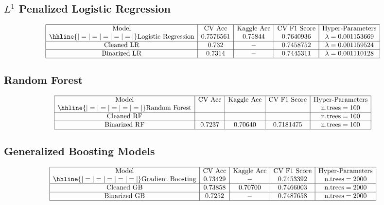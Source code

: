 \documentclass{article}
\begin{document}
\subsection{$L^1$ Penalized Logistic Regression}
$$\begin{array}{|c|c|c|c|c|}
\hline
\text{Model} & \text{CV Acc} & \text{Kaggle Acc} & \text{CV F1 Score} & \text{Hyper-Parameters} \\
\hhline{|=|=|=|=|=|}
\text{Logistic Regression} & 0.7576561 & 0.75844 & 0.7640936 & \lambda = 0.001153669\\
\hline
\text{Cleaned LR} & 0.732 & - & 0.7458752 & \lambda = 0.001159524 \\
\hline
\text{Binarized LR} & 0.7314 & - & 0.7445311 & \lambda = 0.001110128 \\
\hline
\end{array}$$

\subsection{Random Forest}
$$\begin{array}{|c|c|c|c|c|}
\hline
\text{Model} & \text{CV Acc} & \text{Kaggle Acc} & \text{CV F1 Score} & \text{Hyper-Parameters}   \\
\hhline{|=|=|=|=|=|}
\text{Random Forest} &  &  &  & \text{n.trees} = 100 \\
\hline
\text{Cleaned RF} &  &  &  & \text{n.trees} = 100 \\
\hline
\text{Binarized RF} & 0.7237 & 0.70640 & 0.7181475 & \text{n.trees} = 100 \\
\hline
\end{array}$$

\subsection{Generalized Boosting Models}
$$\begin{array}{|c|c|c|c|c|}
\hline
\text{Model} & \text{CV Acc} & \text{Kaggle Acc} & \text{CV F1 Score} & \text{Hyper-Parameters} \\
\hhline{|=|=|=|=|=|}
\text{Gradient Boosting} &0.73429  & - & 0.7453392 & \text{n.trees} = 2000 \\
\hline
\text{Cleaned GB} & 0.73858 & 0.70700 & 0.7466003 & \text{n.trees} = 2000 \\
\hline
\text{Binarized GB} & 0.7252 & - & 0.7487658 & \text{n.trees} = 2000 \\
\hline
\end{array}$$
\end{document}
